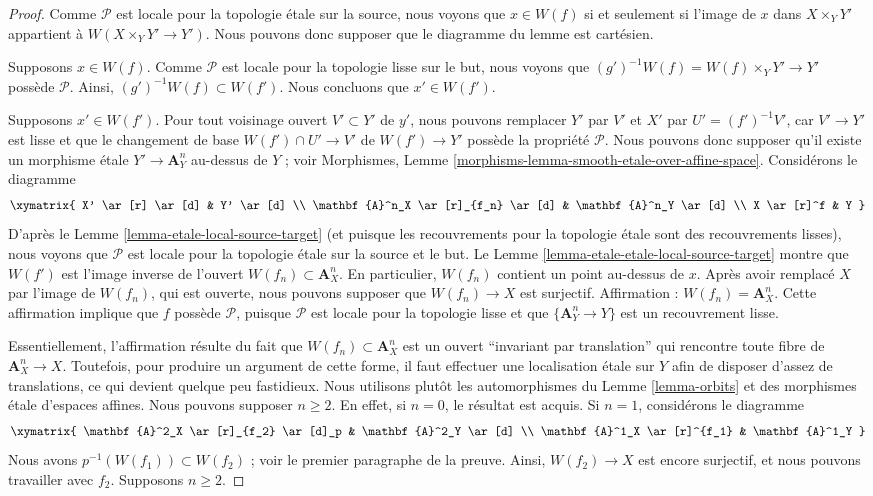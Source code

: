 \begin{proof}
Comme $\mathcal{P}$ est locale pour la topologie \'etale sur la source, nous
voyons que $x \in W(f)$ si et seulement si l'image de $x$ dans
$X \times_Y Y'$ appartient à $W(X \times_Y Y' \to Y')$. Nous pouvons donc
supposer que le diagramme du lemme est cartésien.

\medskip\noindent
Supposons $x \in W(f)$. Comme $\mathcal{P}$ est locale pour la topologie lisse
sur le but, nous voyons que $(g')^{-1}W(f) = W(f) \times_Y Y' \to Y'$ possède
$\mathcal{P}$. Ainsi, $(g')^{-1}W(f) \subset W(f')$. Nous concluons que
$x' \in W(f')$.

\medskip\noindent
Supposons $x' \in W(f')$. Pour tout voisinage ouvert $V' \subset Y'$ de $y'$,
nous pouvons remplacer $Y'$ par $V'$ et $X'$ par $U' = (f')^{-1}V'$, car
$V' \to Y'$ est lisse et que le changement de base
$W(f') \cap U' \to V'$ de $W(f') \to Y'$ possède la propriété $\mathcal{P}$.
Nous pouvons donc supposer qu'il existe un morphisme \'etale
$Y' \to \mathbf{A}^n_Y$ au-dessus de $Y$ ; voir Morphismes,
Lemme \ref{morphisms-lemma-smooth-etale-over-affine-space}.
Considérons le diagramme
$$
\xymatrix{
X' \ar[r] \ar[d] & Y' \ar[d] \\
\mathbf{A}^n_X \ar[r]_{f_n} \ar[d] & \mathbf{A}^n_Y \ar[d] \\
X \ar[r]^f & Y
}
$$
D'après le Lemme \ref{lemma-etale-local-source-target} (et puisque les
recouvrements pour la topologie \'etale sont des recouvrements lisses), nous
voyons que $\mathcal{P}$ est locale pour la topologie \'etale sur la source et
le but. Le Lemme \ref{lemma-etale-etale-local-source-target} montre que
$W(f')$ est l'image inverse de l'ouvert $W(f_n) \subset \mathbf{A}^n_X$. En
particulier, $W(f_n)$ contient un point au-dessus de $x$. Après avoir remplacé
$X$ par l'image de $W(f_n)$, qui est ouverte, nous pouvons supposer que
$W(f_n) \to X$ est surjectif. Affirmation :
$W(f_n) = \mathbf{A}^n_X$. Cette affirmation implique que $f$ possède
$\mathcal{P}$, puisque $\mathcal{P}$ est locale pour la topologie lisse et que
$\{\mathbf{A}^n_Y \to Y\}$ est un recouvrement lisse.

\medskip\noindent
Essentiellement, l'affirmation résulte du fait que
$W(f_n) \subset \mathbf{A}^n_X$ est un ouvert ``invariant par translation''
qui rencontre toute fibre de $\mathbf{A}^n_X \to X$. Toutefois, pour produire
un argument de cette forme, il faut effectuer une localisation \'etale sur
$Y$ afin de disposer d'assez de translations, ce qui devient quelque peu
fastidieux. Nous utilisons plutôt les automorphismes du
Lemme \ref{lemma-orbits} et des morphismes \'etale d'espaces affines.
Nous pouvons supposer $n \geq 2$. En effet, si $n = 0$, le résultat est acquis.
Si $n = 1$, considérons le diagramme
$$
\xymatrix{
\mathbf{A}^2_X \ar[r]_{f_2} \ar[d]_p & \mathbf{A}^2_Y \ar[d] \\
\mathbf{A}^1_X \ar[r]^{f_1} & \mathbf{A}^1_Y
}
$$
Nous avons $p^{-1}(W(f_1)) \subset W(f_2)$ ; voir le premier paragraphe de la
preuve. Ainsi, $W(f_2) \to X$ est encore surjectif, et nous pouvons travailler
avec $f_2$. Supposons $n \geq 2$.


\end{proof}
